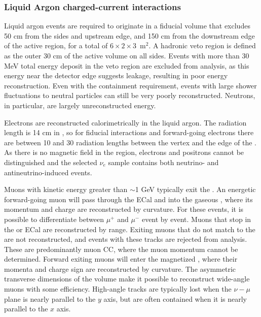 \subsubsection{Liquid Argon charged-current interactions}

Liquid argon events are required to originate in a fiducial volume that excludes 50 cm from the sides and upstream edge, and 150 cm from the downstream edge of the active region, for a total of $6 \times 2 \times 3$~m$^{2}$. A hadronic veto region is defined as the outer 30 cm of the active volume on all sides. Events with more than 30 MeV total energy deposit in the veto region are excluded from analysis, as this energy near the detector edge suggests leakage, resulting in poor energy reconstruction. Even with the containment requirement, events with large shower fluctuations to neutral particles can still be very poorly reconstructed. Neutrons, in particular, are largely unreconstructed energy.

Electrons are reconstructed calorimetrically in the liquid argon. The radiation length is 14 cm in , so for fiducial interactions and forward-going electrons there are between 10 and 30 radiation lengths between the vertex and the edge of the . As there is no magnetic field in the   region, electrons and positrons cannot be distinguished and the selected $\nu_{e}$ sample contains both neutrino- and antineutrino-induced events.

Muons with kinetic energy greater than $\sim$1 GeV typically exit the . An energetic forward-going muon will pass through the ECal and into the gaseous , where its momentum and charge are reconstructed by curvature. For these events, it is possible to differentiate between $\mu^{+}$ and $\mu^{-}$ event by event. Muons that stop in the  or ECal are reconstructed by range. Exiting muons that do not match to the   are not reconstructed, and events with these tracks are rejected from analysis.
These are predominantly muon CC, where the muon momentum cannot be determined. Forward exiting muons will enter the magnetized , where their momenta and charge sign are reconstructed by curvature. The asymmetric transverse dimensions of the  volume make it possible to reconstruct wide-angle muons with some efficiency. High-angle tracks are typically lost when the $\nu-\mu$ plane is nearly parallel to the $y$ axis, but are often contained when it is nearly parallel to the $x$ axis. 

